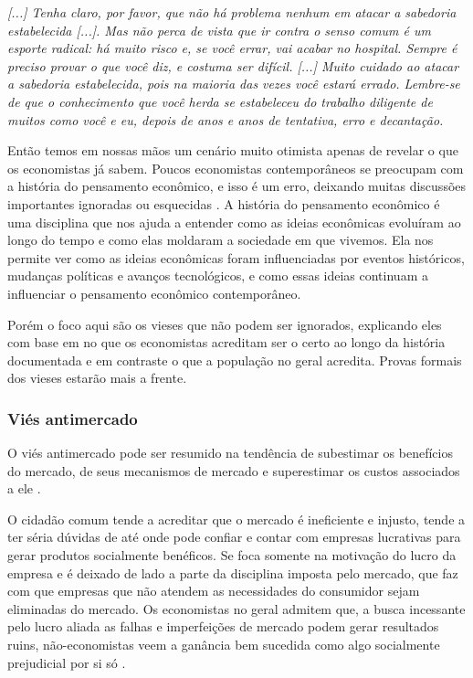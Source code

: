 \begin{citacao}
    \textit{[...] Tenha claro, por favor, que não há problema nenhum em atacar a sabedoria estabelecida [...]. Mas não perca de vista que ir contra o senso comum é um esporte radical: há muito risco e, se você errar, vai acabar no hospital. Sempre é preciso provar o que você diz, e costuma ser difícil. [...] Muito cuidado ao atacar a sabedoria estabelecida, pois na maioria das vezes você estará errado. Lembre-se de que o conhecimento que você herda se estabeleceu do trabalho diligente de muitos como você e eu, depois de anos e anos de tentativa, erro e decantação. \newline
    }  \cite{franco2022cartas}
\end{citacao}

Então temos em nossas mãos um cenário muito otimista apenas de revelar o que os economistas já sabem. Poucos economistas contemporâneos se preocupam com a história do pensamento econômico, e isso é um erro, deixando muitas discussões importantes ignoradas ou esquecidas \cite{mark_history}. A história do pensamento econômico é uma disciplina que nos ajuda a entender como as ideias econômicas evoluíram ao longo do tempo e como elas moldaram a sociedade em que vivemos. Ela nos permite ver como as ideias econômicas foram influenciadas por eventos históricos, mudanças políticas e avanços tecnológicos, e como essas ideias continuam a influenciar o pensamento econômico contemporâneo.

Porém o foco aqui são os vieses que não podem ser ignorados, explicando eles com base em no que os economistas acreditam ser o certo ao longo da história documentada e em contraste o que a população no geral acredita. Provas formais dos vieses estarão mais a frente.


\subsubsection{Viés antimercado}

O viés antimercado pode ser resumido na tendência de subestimar os benefícios do mercado, de seus mecanismos de mercado e superestimar os custos associados a ele \cite{sowell2000basic,sowell2004applied,The_Myth_of_the_Rational_Voter}. 

O cidadão comum tende a acreditar que o mercado é ineficiente e injusto, tende a ter séria dúvidas de até onde pode confiar e contar com empresas lucrativas para gerar produtos socialmente benéficos. Se foca somente na motivação do lucro da empresa e é deixado de lado a parte da disciplina imposta pelo mercado, que faz com que empresas que não atendem as necessidades do consumidor sejam eliminadas do mercado. Os economistas no geral admitem que, a busca incessante pelo lucro aliada as falhas e imperfeições de mercado podem gerar resultados ruins, não-economistas veem a ganância bem sucedida como algo socialmente prejudicial por si só \cite{The_Myth_of_the_Rational_Voter}.

